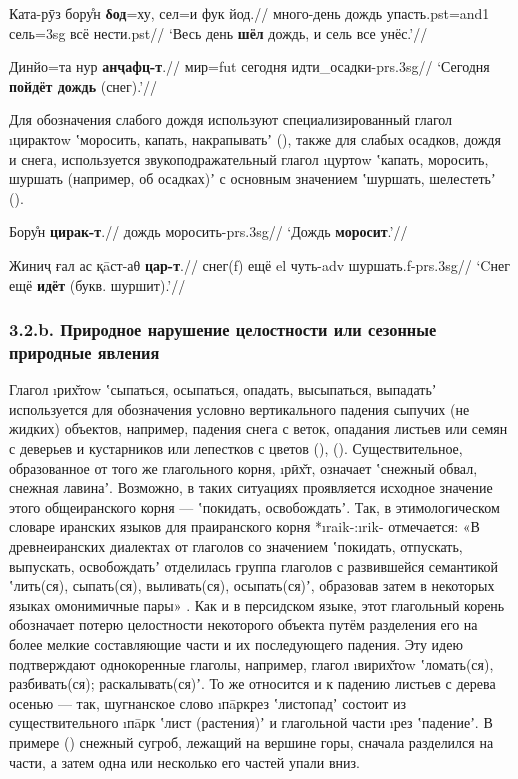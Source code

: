 \begingl
\gla Ката-рӯз бору̊н \textbf{δод}=ху, сел=и фук йод.//
\glc много-день дождь упасть.{\sc pst=and1} сель={\sc 3sg} всё нести.{\sc pst}//
\glft ‘Весь день \textbf{шёл} дождь, и сель все унёс.’//
\endgl \xe

\begingl
\gla Динйо=та нур \textbf{анҷафц-т}.//
\glc мир={\sc fut} сегодня идти\_осадки-{\sc prs.3sg}//
\glft ‘Сегодня \textbf{пойдёт дождь} (снег).’//
\endgl \xe

Для обозначения слабого дождя используют специализированный глагол \i{цирактоw} ʽморосить, капать, накрапыватьʼ \parencite[305]{karamshoev1999} (), также для слабых осадков, дождя и снега, используется звукоподражательный глагол \i{цуртоw} ʽкапать, моросить, шуршать (например, об осадках)ʼ \parencite[315]{karamshoev1999} с основным значением ʽшуршать, шелестетьʼ ().

\begingl
\gla Бору̊н \textbf{цирак-т}.//
\glc дождь моросить-{\sc prs.3sg}//
\glft ‘Дождь \textbf{моросит}.’//
\endgl \xe

\begingl
\gla Жиниҷ ғал ас қāст-аθ \textbf{цар-т}.//
\glc снег({\sc f}) ещё {\sc el} чуть-{\sc adv} шуршать.{\sc f-prs.3sg}//
\glft ‘Cнег ещё \textbf{идёт} (букв. шуршит).’//
\endgl \xe

\subsubsection{3.2.b. Природное нарушение целостности или сезонные природные явления} \label{pour-32b}

Глагол \i{рих̌тоw} ʽсыпаться, осыпаться, опадать, высыпаться, выпадатьʼ \parencite[474]{karamshoev1991} используется для обозначения условно вертикального падения сыпучих (не жидких) объектов, например, падения снега с веток, опадания листьев или семян с деверьев и кустарников или лепестков с цветов (), (). Существительное, образованное от того же глагольного корня, \i{рӣх̌т}, означает ʽснежный обвал, снежная лавинаʼ. Возможно, в таких ситуациях проявляется исходное значение этого общеиранского корня — ʽпокидать, освобождатьʼ. Так, в этимологическом словаре иранских языков для праиранского корня *\i{raik}-:\i{rik}- отмечается: «В древнеиранских диалектах от глаголов со значением ʽпокидать, отпускать, выпускать, освобождатьʼ отделилась группа глаголов с развившейся семантикой ʽлить(ся), сыпать(ся), выливать(ся), осыпать(ся)ʼ, образовав затем в некоторых языках омонимичные пары» \parencite[342]{edelman2020_dict}. Как и в персидском языке, этот глагольный корень обозначает потерю целостности некоторого объекта путём разделения его на более мелкие составляющие части и их последующего падения. Эту идею подтверждают однокоренные глаголы, например, глагол \i{вирих̌тоw} ʽломать(ся), разбивать(ся); раскалывать(ся)ʼ. То же относится и к падению листьев с дерева осенью — так, шугнанское слово \i{пāркрез} ʽлистопадʼ состоит из существительного \i{пāрк} ʽлист (растения)ʼ и глагольной части \i{рез} ʽпадениеʼ. В примере () снежный сугроб, лежащий на вершине горы, сначала разделился на части, а затем одна или несколько его частей упали вниз.

